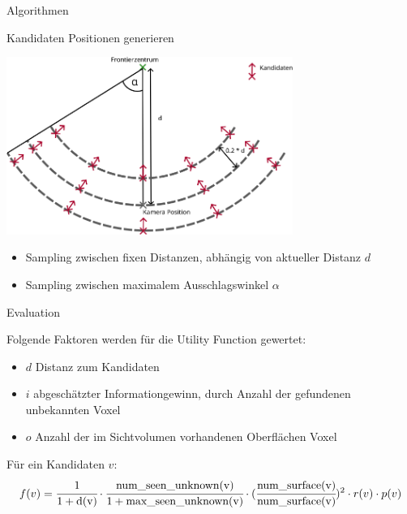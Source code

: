 \documentclass{beamer}
\begin{document}
\begin{frame}{Algorithmen}
	\begin{block}{Kandidaten Positionen generieren}

		\begin{center}
			\includegraphics[width=0.7\textwidth]{Graphics/view_point_gen_v2.png}
		\end{center}
		\begin{itemize}
			\item Sampling zwischen fixen Distanzen, abhängig von aktueller Distanz $d$
			\item Sampling zwischen maximalem Ausschlagswinkel $\alpha$
		\end{itemize}
	\end{block}

\end{frame}

\begin{frame}{Evaluation}
	\begin{block}{}
		Folgende Faktoren werden für die Utility Function gewertet:
		\begin{itemize}
			\item $d$ Distanz zum Kandidaten
			\item $i$ abgeschätzter Informationgewinn, durch Anzahl der gefundenen unbekannten Voxel
			\item $o$ Anzahl der im Sichtvolumen vorhandenen Oberflächen Voxel
		\end{itemize}

		Für ein Kandidaten $v$:
		\[f(v) = \cfrac{1}{1 + \text{d(v)}} \cdot \cfrac{\text{num\_seen\_unknown(v)}}{1 + \text{max\_seen\_unknown(v)}} \cdot (\cfrac{\text{num\_surface(v)}}{\text{num\_surface(v)}})^2 \cdot r(v) \cdot p(v)\]
	\end{block}
\end{frame}
\end{document}
